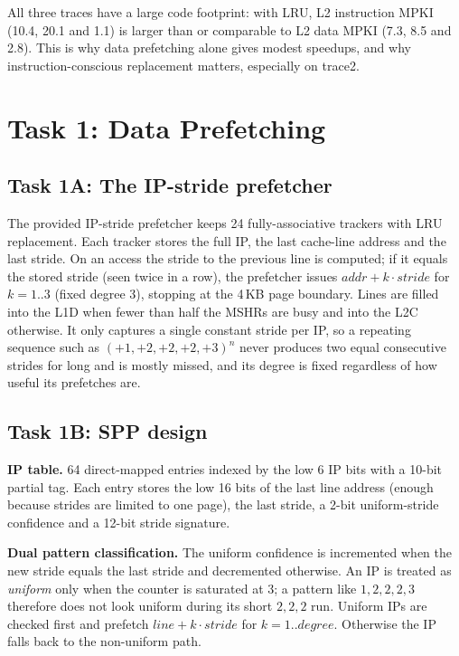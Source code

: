 \documentclass[conference]{IEEEtran}
\begin{document}
All three traces have a large code footprint: with LRU, L2 instruction MPKI
(10.4, 20.1 and 1.1) is larger than or comparable to L2 data MPKI (7.3, 8.5
and 2.8). This is why data prefetching alone gives modest speedups, and
why instruction-conscious replacement matters, especially on trace2.

\section{Task 1: Data Prefetching}

\subsection{Task 1A: The IP-stride prefetcher}
The provided IP-stride prefetcher keeps 24 fully-associative trackers with
LRU replacement. Each tracker stores the full IP, the last cache-line address
and the last stride. On an access the stride to the previous line is
computed; if it equals the stored stride (seen twice in a row), the
prefetcher issues $\mathit{addr}+k\cdot\mathit{stride}$ for $k=1..3$
(fixed degree 3), stopping at the 4\,KB page boundary. Lines are filled into
the L1D when fewer than half the MSHRs are busy and into the L2C otherwise.
It only captures a single constant stride per IP, so a repeating sequence
such as $(+1,+2,+2,+2,+3)^n$ never produces two equal consecutive strides
for long and is mostly missed, and its degree is fixed regardless of how
useful its prefetches are.

\subsection{Task 1B: SPP design}
\textbf{IP table.} 64 direct-mapped entries indexed by the low 6 IP bits with
a 10-bit partial tag. Each entry stores the low 16 bits of the last line
address (enough because strides are limited to one page), the last stride,
a 2-bit uniform-stride confidence and a 12-bit stride signature.

\textbf{Dual pattern classification.} The uniform confidence is incremented
when the new stride equals the last stride and decremented otherwise. An IP
is treated as \emph{uniform} only when the counter is saturated at 3; a
pattern like $1,2,2,2,3$ therefore does not look uniform during its short
$2,2,2$ run. Uniform IPs are checked first and prefetch
$\mathit{line}+k\cdot\mathit{stride}$ for $k=1..\mathit{degree}$. Otherwise the
IP falls back to the non-uniform path.
\end{document}
